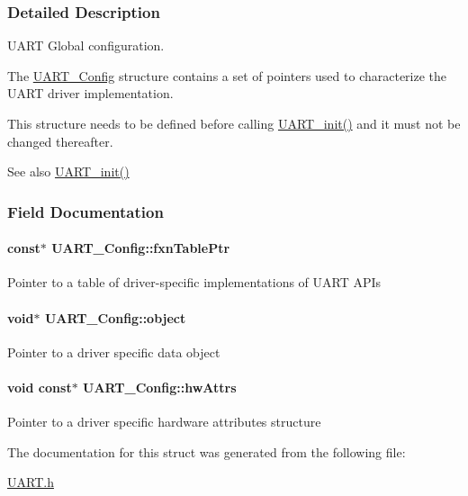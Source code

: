 \subsubsection{Detailed Description}
U\+A\+R\+T Global configuration. 

The \hyperlink{struct_u_a_r_t___config}{U\+A\+R\+T\+\_\+\+Config} structure contains a set of pointers used to characterize the U\+A\+R\+T driver implementation.

This structure needs to be defined before calling \hyperlink{_u_a_r_t_8h_ab60a36f7295d704926120d22f806dcd1}{U\+A\+R\+T\+\_\+init()} and it must not be changed thereafter.

\begin{DoxySeeAlso}{See also}
\hyperlink{_u_a_r_t_8h_ab60a36f7295d704926120d22f806dcd1}{U\+A\+R\+T\+\_\+init()} 
\end{DoxySeeAlso}


\subsubsection{Field Documentation}
\paragraph[{fxn\+Table\+Ptr}]{ const$\ast$ U\+A\+R\+T\+\_\+\+Config\+::fxn\+Table\+Ptr}\label{struct_u_a_r_t___config_a9e8073b7f55a5b3bc70d377e3b3f1375}
Pointer to a table of driver-\/specific implementations of U\+A\+R\+T A\+P\+Is 
\paragraph[{object}]{\setlength{\rightskip}{0pt plus 5cm}void$\ast$ U\+A\+R\+T\+\_\+\+Config\+::object}\label{struct_u_a_r_t___config_a6472bcf07cd2c8ed0045fe01a934f583}
Pointer to a driver specific data object 
\paragraph[{hw\+Attrs}]{\setlength{\rightskip}{0pt plus 5cm}void const$\ast$ U\+A\+R\+T\+\_\+\+Config\+::hw\+Attrs}\label{struct_u_a_r_t___config_ad0baf0ebc820bca98fc7fbd089d1c55c}
Pointer to a driver specific hardware attributes structure 

The documentation for this struct was generated from the following file\+:\begin{DoxyCompactItemize}
\item 
\hyperlink{_u_a_r_t_8h}{U\+A\+R\+T.\+h}\end{DoxyCompactItemize}
